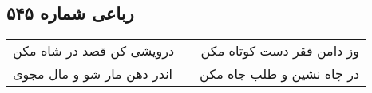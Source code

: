\begin{center}
\section*{رباعی شماره ۵۴۵}
\label{sec:sh545}
\begin{longtable}{l p{0.5cm} r}
درویشی کن قصد در شاه مکن
&&
وز دامن فقر دست کوتاه مکن
\\
اندر دهن مار شو و مال مجوی
&&
در چاه نشین و طلب جاه مکن
\\
\end{longtable}
\end{center}
